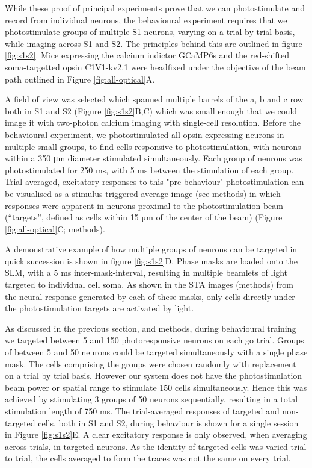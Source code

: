 While these proof of principal experiments prove that we can photostimulate and record from individual neurons, the behavioural experiment requires that we photostimulate groups of multiple S1 neurons, varying on a trial by trial basis, while imaging across S1 and S2. The principles behind this are outlined in figure \ref{fig:s1s2}. Mice expressing the calcium indictor GCaMP6s \cite{chen_ultrasensitive_2013} and the red-shifted soma-targetted opsin C1V1-kv2.1 \cite{yizhar_neocortical_2011, chettih_single-neuron_2019} were headfixed under the objective of the beam path outlined in Figure \ref{fig:all-optical}A.
        
A field of view was selected which spanned multiple barrels of the a, b and c row both in S1 and S2 (Figure \ref{fig:s1s2}B,C) which was small enough that we could image it with two-photon calcium imaging with single-cell resolution. Before the behavioural experiment, we photostimulated all opsin-expressing neurons in multiple small groups, to find cells responsive to photostimulation, with neurons within a 350 μm diameter stimulated simultaneously. Each group of neurons was photostimulated for 250 ms, with 5 ms between the stimulation of each group. Trial averaged, excitatory responses to this "pre-behaviour" photostimulation can be visualised as a stimulus triggered average image (see methods) in which responses were apparent in neurons proximal to the photostimulation beam (“targets”, defined as cells within 15 µm of the center of the beam) (Figure \ref{fig:all-optical}C; methods).

A demonstrative example of how multiple groups of neurons can be targeted in quick succession is shown in figure \ref{fig:s1s2}D. Phase masks are loaded onto the SLM, with a 5 ms inter-mask-interval, resulting in multiple beamlets of light targeted to individual cell soma. As shown in the STA images (methods) from the neural response generated by each of these masks, only cells directly under the photostimulation targets are activated by light. 

As discussed in the previous section, and methods, during behavioural training we targeted between 5 and 150 photoresponsive neurons on each go trial. Groups of between 5 and 50 neurons could be targeted simultaneously with a single phase mask. The cells comprising the groups were chosen randomly with replacement on a trial by trial basis. However our system does not have the photostimulation beam power or spatial range to stimulate 150 cells simultaneously. Hence this was achieved by stimulating 3 groups of 50 neurons sequentially, resulting in a total stimulation length of 750 ms. The trial-averaged responses of targeted and non-targeted cells, both in S1 and S2, during behaviour is shown for a single session in Figure \ref{fig:s1s2}E. A clear excitatory response is only observed, when averaging across trials, in targeted neurons. As the identity of targeted cells was varied trial to trial, the cells averaged to form the traces was not the same on every trial.

